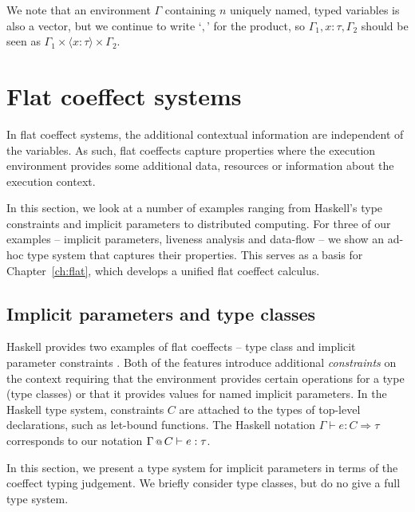 We note that an environment $\Gamma$ containing $n$ uniquely named, typed variables is also a vector, 
but we continue to write `$,$' for the product, so $\Gamma_1, x\!:\!\tau, \Gamma_2$ should 
be seen as $\Gamma_1 \times \langle x\!:\!\tau\rangle \times \Gamma_2$.


\section{Flat coeffect systems}

In flat coeffect systems, the additional contextual information are independent of the variables.
As such, flat coeffects capture properties where the execution environment provides some 
additional data, resources or information about the execution context.

In this section, we look at a number of examples ranging from Haskell's type constraints
and implicit parameters to distributed computing. For three of our examples --
implicit parameters, liveness analysis and data-flow -- we show an ad-hoc type system that
captures their properties. This serves as a basis for Chapter~\ref{ch:flat}, which develops
a unified flat coeffect calculus.


\subsection{Implicit parameters and type classes} 
\label{sec:applications-flat-impl}

Haskell provides two examples of flat coeffects -- type class and implicit parameter constraints
\cite{app-type-classes,app-implicit-parameters}. Both of the features introduce additional 
\emph{constraints} on the context requiring that the environment provides certain operations for
a type (type classes) or that it provides values for named implicit parameters.
In the Haskell type system, constraints $C$ are attached to the types of top-level declarations,
such as let-bound functions. The Haskell notation $\Gamma \vdash e : C \Rightarrow \tau$ 
corresponds to our notation $\Gamma \,\text{\scriptsize @}\, {{\text{$C$}}} \vdash e : \tau$. 

In this section, we present a type system for implicit parameters in terms of the coeffect typing
judgement. We briefly consider type classes, but do no give a full type system.

